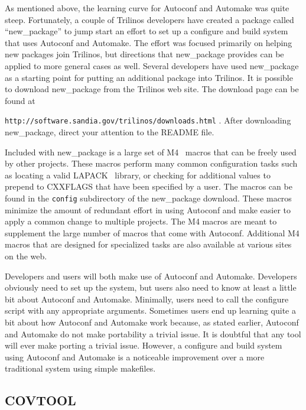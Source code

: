 \documentclass[12pt,relax]{article}
\newcommand{\InlineDirectory}[1]{
  {\hspace{0.01 in}} {\tt #1} {\hspace{0.01 in}}}
\begin{document}
As mentioned above, the learning curve for Autoconf and Automake was quite 
steep.  Fortunately, a couple of Trilinos developers have created a package 
called ``new\_package'' to jump start an effort to set up a configure and 
build system that uses Autoconf and Automake.  The effort was focused 
primarily on helping new packages join Trilinos, but directions that 
new\_package provides can be applied to more general cases as well.  Several
developers have used new\_package as a starting point for putting an additional
package into Trilinos.  It is possible to download new\_package from the 
Trilinos web site.  The download page can be found at \newline 
\InlineDirectory{http://software.sandia.gov/trilinos/downloads.html}.  After
downloading new\_package, direct your attention to the README file.

Included with new\_package is a large set of M4~\cite{M4} macros that can 
be freely used by other projects.  These macros perform many common 
configuration tasks such as locating a valid LAPACK~\cite{lapack} library, 
or checking for additional values to prepend to CXXFLAGS that have been 
specified by a user.  The macros can be found in the \InlineDirectory{config}
subdirectory of the new\_package download.  These macros minimize the amount of
redundant effort in using Autoconf and make easier to apply a common change to 
multiple projects.  The M4 macros are meant to supplement the large number of 
macros that come with Autoconf.  Additional M4 macros that are designed for 
specialized tasks are also available at various sites on the web.

Developers and users will both make use of Autoconf and Automake.  Developers 
obviously need to set up the system, but users also need to know at least a 
little bit about Autoconf and Automake.  Minimally, users need to call the 
configure script with any appropriate arguments.  Sometimes users end up 
learning quite a bit about how Autoconf and Automake work because, as stated 
earlier, Autoconf and Automake do not make portability a trivial issue.  It is 
doubtful that any tool will ever make porting a trivial issue.  However, a 
configure and build system using Autoconf and Automake is a 
noticeable improvement over a more traditional system using simple makefiles.

\subsection{COVTOOL}
\end{document}
